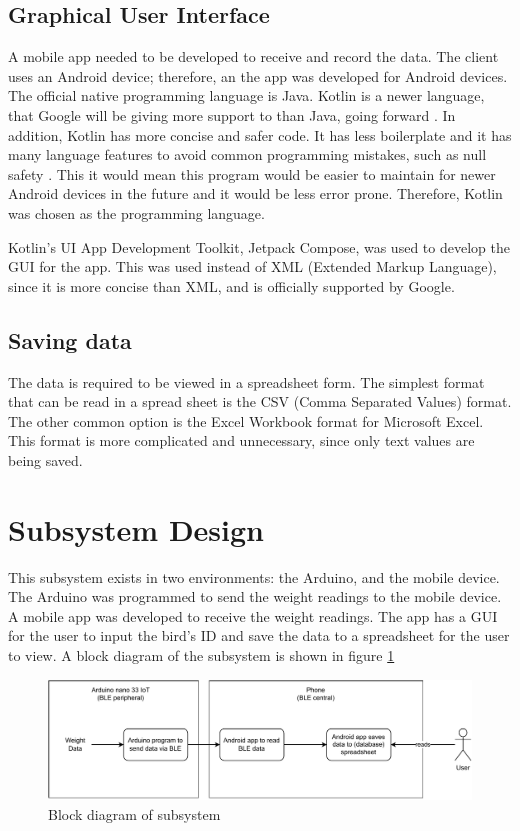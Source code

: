 \documentclass[class=report,11pt,crop=false]{standalone}
\begin{document}
		\subsection{Graphical User Interface}
		A mobile app needed to be developed to receive and record the data. The client uses an Android device; therefore, an the app was developed for Android devices. The official native programming language is Java. Kotlin is a newer language, that Google will be giving more support to than Java, going forward \cite{kotlin}. In addition, Kotlin has more concise and safer code. It has less boilerplate and it has many language features to avoid common programming mistakes, such as null safety \cite{kotlin}.
		This it would mean this program would be easier to maintain for newer Android devices in the future and it would be less error prone. Therefore, Kotlin was chosen as the programming language.
		
		Kotlin's UI App Development Toolkit, Jetpack Compose, was used to develop the GUI for the app. This was used instead of XML (Extended Markup Language), since it is more concise than XML, and is officially supported by Google.
			
		
		\subsection{Saving data}
		The data is required to be viewed in a spreadsheet form. The simplest format that can be read in a spread sheet is the CSV (Comma Separated Values) format. The other common option is the Excel Workbook format for Microsoft Excel. This format is more complicated and unnecessary, since only text values are being saved.
		
	
	\section{Subsystem Design}
		
		This subsystem exists in two environments: the Arduino, and the mobile device. The Arduino was programmed to send the weight readings to the mobile device. A mobile app was developed to receive the weight readings. The app has a GUI for the user to input the bird's ID and save the data to a spreadsheet for the user to view. A block diagram of the subsystem is shown in figure \ref{fig:block-diagram}
		
		\begin{figure}[h!]
			\centering
			\includegraphics[width=0.9\linewidth]{Figures/Starling data block diagram.pdf}
			\caption{Block diagram of subsystem}
			\label{fig:block-diagram}
		\end{figure}
		
\end{document}
